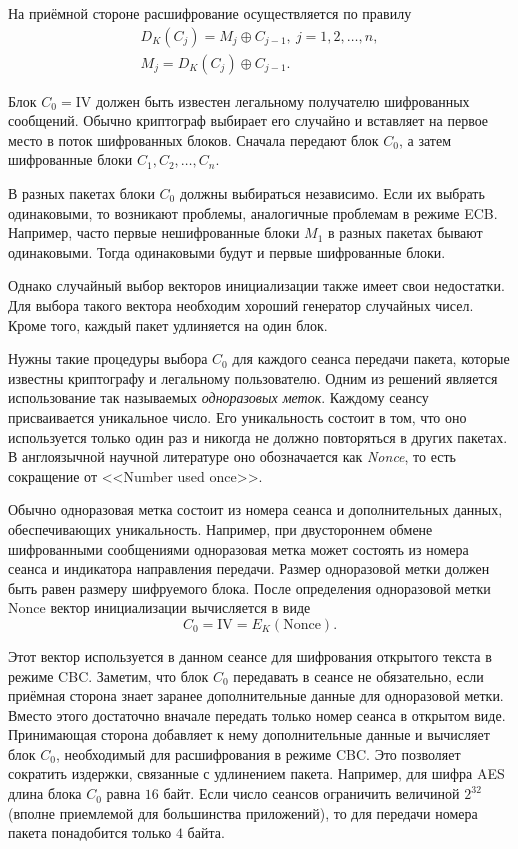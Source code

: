 На приёмной стороне расшифрование осуществляется по правилу
\[ \begin{array}{l}
    D_K(C_j) = M_j \oplus C_{j-1}, ~ j=1, 2, \dots, n,\\
    M_{j} = D_K(C_j) \oplus C_{j-1}.
\end{array} \]

Блок $C_0 = \textrm{IV}$ должен быть известен легальному получателю шифрованных сообщений. Обычно криптограф выбирает его случайно и вставляет на первое место в поток шифрованных блоков. Сначала передают блок $C_0$, а затем шифрованные блоки $C_1, C_2, \ldots, C_n$.

В разных пакетах блоки $C_0$ должны выбираться независимо. Если их выбрать одинаковыми, то возникают проблемы, аналогичные проблемам в режиме ECB. Например, часто первые нешифрованные блоки $M_1$ в разных пакетах бывают одинаковыми. Тогда одинаковыми будут и первые шифрованные блоки.

Однако случайный выбор векторов инициализации также имеет свои недостатки. Для выбора такого вектора необходим хороший генератор случайных чисел. Кроме того, каждый пакет удлиняется на один блок.

Нужны такие процедуры выбора $C_0$ для каждого сеанса передачи пакета, которые известны криптографу и легальному пользователю. Одним из решений является использование так называемых \emph{одноразовых меток}. Каждому сеансу присваивается уникальное число. Его уникальность состоит в том, что оно используется только один раз и никогда не должно повторяться в других пакетах. В англоязычной научной литературе оно обозначается как \emph{Nonce}, то есть сокращение от <<Number used once>>.

Обычно одноразовая метка состоит из номера сеанса и дополнительных данных, обеспечивающих уникальность. Например, при двустороннем обмене шифрованными сообщениями одноразовая метка может состоять из номера сеанса и индикатора направления передачи. Размер одноразовой метки должен быть равен размеру шифруемого блока. После определения одноразовой метки $\textrm{Nonce}$ вектор инициализации вычисляется в виде
    \[ C_0 = \textrm{IV} = E_K(\textrm{Nonce}). \]

Этот вектор используется в данном сеансе для шифрования открытого текста в режиме CBC. Заметим, что блок $C_0$ передавать в сеансе не обязательно, если приёмная сторона знает заранее дополнительные данные для одноразовой метки. Вместо этого достаточно вначале передать только номер сеанса в открытом виде. Принимающая сторона добавляет к нему дополнительные данные и вычисляет блок $C_0$, необходимый для расшифрования в режиме CBC. Это позволяет сократить издержки, связанные с удлинением пакета. Например, для шифра AES длина блока $C_0$ равна $16$ байт. Если число сеансов ограничить величиной $2^{32}$ (вполне приемлемой для большинства приложений), то для передачи номера пакета понадобится только $4$ байта.


